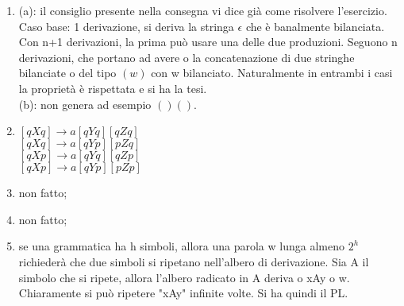 \documentclass[a4paper,11pt]{article}
\begin{document}
\begin{enumerate}
    \item (a): il consiglio presente nella consegna vi dice già come risolvere l'esercizio. Caso base: 1 derivazione, si deriva la stringa $\epsilon$ che è banalmente bilanciata. Con n+1 derivazioni, la prima può usare una delle due produzioni. Seguono n derivazioni, che portano ad avere o la concatenazione di due stringhe bilanciate o del tipo $(w)$ con w bilanciato. Naturalmente in entrambi i casi la proprietà è rispettata e si ha la tesi.
    \\(b): non genera ad esempio $()()$.
    \item \begin{minipage}{\linewidth}
        $[qXq] \rightarrow a[qYq][qZq]$\\
        $[qXq] \rightarrow a[qYp][pZq]$\\
        $[qXp] \rightarrow a[qYq][qZp]$\\
        $[qXp] \rightarrow a[qYp][pZp]$\\
    \end{minipage}
    \item non fatto;
    \item non fatto;
    \item se una grammatica ha h simboli, allora una parola w lunga almeno $2^h$ richiederà che due simboli si ripetano nell'albero di derivazione. Sia A il simbolo che si ripete, allora l'albero radicato in A deriva o xAy o w. Chiaramente si può ripetere "xAy" infinite volte. Si ha quindi il PL.
\end{enumerate}
\end{document}
